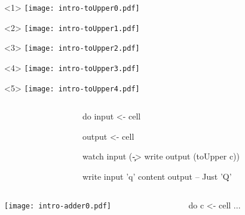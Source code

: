 \documentclass[UKenglish,usenames,dvipsnames,svgnames,table,aspectratio=169,mathserif]{beamer}
\newcommand{\nl}{\vspace{\baselineskip}}
\newcommand{\pnl}{\pause \nl}
\begin{document}
\begin{frame}[fragile]
\centering

\begin{overlayarea}{0.5\textwidth}{0.4\textheight}
\begin{onlyenv}<1>
\texttt{[image: intro-toUpper0.pdf]}
\end{onlyenv}
\begin{onlyenv}<2>
\texttt{[image: intro-toUpper1.pdf]}
\end{onlyenv}
\begin{onlyenv}<3>
\texttt{[image: intro-toUpper2.pdf]}
\end{onlyenv}
\begin{onlyenv}<4>
\texttt{[image: intro-toUpper3.pdf]}
\end{onlyenv}
\begin{onlyenv}<5>
\texttt{[image: intro-toUpper4.pdf]}
\end{onlyenv}
\end{overlayarea}


\begin{columns}
\begin{column}{0.3\textwidth}
\end{column}
\begin{column}{0.7\textwidth}
\begin{haskellcode}
do
  input  <- cell
\end{haskellcode}
\pause
\begin{haskellcode}
  output <- cell
\end{haskellcode}
\pause
\begin{haskellcode}
  watch input (\c ->
    write output (toUpper c))
\end{haskellcode}
\pnl
\begin{haskellcode}
  write input 'q'
  content output   -- Just 'Q'
\end{haskellcode}
\end{column}
\end{columns}
\end{frame}


\iffalse

\begin{frame}[fragile]
\begin{columns}
\begin{column}{0.5\textwidth}
\texttt{[image: intro-adder0.pdf]}
\end{column}
\begin{column}{0.5\textwidth}
\begin{haskellcode}
do
  c <- cell
  ...
\end{haskellcode}
\end{column}
\end{columns}
\end{frame}
\end{document}

